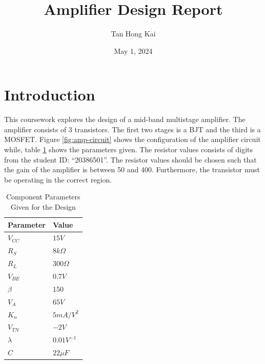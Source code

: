\documentclass{article}
\title{Amplifier Design Report}
\author{Tan Hong Kai}
\date{May 1, 2024}
\begin{document}
\maketitle

\section{Introduction}

This coursework explores the design of a mid-band multistage amplifier.
The amplifier consists of 3 transistors.
The first two stages is a BJT and the third is a MOSFET.
Figure \ref{fig:amp-circuit} shows the configuration of the amplifier circuit while, table \ref{tab:component-parameters} shows the parameters given.
The resistor values consists of digits from the student ID: “20386501”.
The resistor values should be chosen such that the gain of the amplifier is between 50 and 400.
Furthermore, the transistor must be operating in the correct region.

\begin{table}[H]
    \caption{Component Parameters Given for the Design}
    \label{tab:component-parameters}
    \centering
    \begin{tabular}{ l l }
        \hline
        Parameter & Value         \\
        \hline
        $V_{CC}$  & $15 V$        \\
        $R_{S}$   & $8 k\Omega$   \\
        $R_{L}$   & $300 \Omega$  \\
        $V_{BE}$  & $0.7 V$       \\
        $\beta$   & $150$         \\
        $V_{A}$   & $65 V$        \\
        $K_{n}$   & $5 mA/V^{2}$  \\
        $V_{TN}$  & $-2 V$        \\
        $\lambda$ & $0.01 V^{-1}$ \\
        $C$       & $22 \mu{F}$   \\
        \hline
    \end{tabular}
\end{table}
\end{document}
